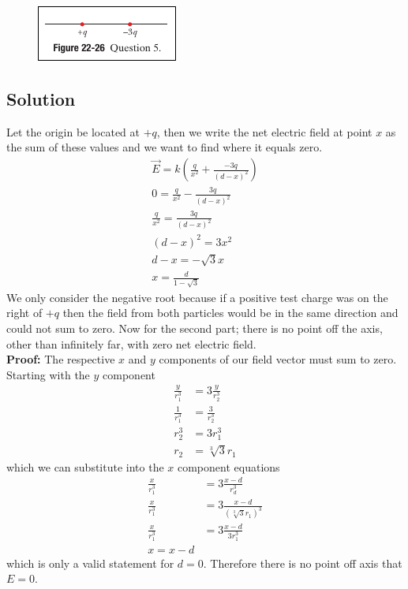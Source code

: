 \documentclass{article}
\begin{document}
\begin{figure}[ht]
    \centering
    \includegraphics[scale=0.75]{image-2.png}
\end{figure}

\subsection*{Solution}
Let the origin be located at $+q$, then we write the net electric field at point $x$ as the sum of these values and we want to find where it equals zero.
\begin{align*}
	\vec{E} = k\left( \frac{q}{x^2} + \frac{-3q}{\left(d-x\right)^2} \right) \\
	0 = \frac{q}{x^2} - \frac{3q}{\left(d-x\right)^2} \\
	\frac{q}{x^2} = \frac{3q}{\left(d-x\right)^2} \\
	\left(d-x\right)^2 = 3x^2 \\
	d-x = - \sqrt{3}x \\
	\boxed{x = \frac{d}{1-\sqrt{3}}}
\end{align*}
We only consider the negative root because if a positive test charge was on the right of $+q$ then the field from both particles would be in the same direction and could not sum to zero.
Now for the second part; there is no point off the axis, other than infinitely far, with zero net electric field. \\
\textbf{Proof:} The respective $x$ and $y$ components of our field vector must sum to zero. Starting with the $y$ component
\begin{align*}
	\frac{y}{r_1^3} &= 3\frac{y}{r_2^3} \\
	\frac{1}{r_1^3} &= \frac{3}{r_2^3} \\
	r_2^3 &= 3r_1^3 \\
	r_2 &= \sqrt[3]{3} r_1
\end{align*}
which we can substitute into the $x$ component equations
\begin{align*}
	\frac{x}{r_1^3} &= 3 \frac{x-d}{r_d^3} \\
	\frac{x}{r_1^3} &= 3 \frac{x-d}{\left(\sqrt[3]{3} r_1\right)^3} \\
	\frac{x}{r_1^3} &= 3 \frac{x-d}{3 r_1^3} \\
	x = x-d
\end{align*}
which is only a valid statement for $d=0$. Therefore there is no point off axis that $E = 0$.
\end{document}
